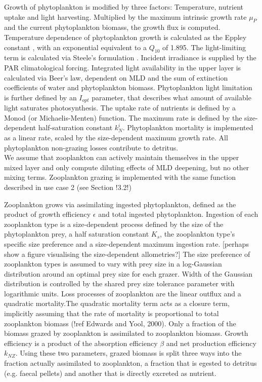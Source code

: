 \documentclass[template.tex]{subfiles}
\begin{document}
Growth of phytoplankton is modified by three factors: Temperature, nutrient uptake and light harvesting. Multiplied by the maximum intrinsic growth rate $\mu_P$ and the current phytoplankton biomass, the growth flux is computed. Temperature dependence of phytoplankton growth is calculated as the Eppley constant \citep{Eppley1972TemperatureSea}, with an exponential equivalent to a $Q_{10}$ of 1.895.
The light-limiting term is calculated via Steele's formulation \citep{Steele1962EnvironmentalSea}. Incident irradiance is supplied by the PAR climatological forcing. Integrated light availability in the upper layer is calculated via Beer's law, dependent on MLD and the sum of extinction coefficients of water and phytoplankton biomass. Phytoplankton light limitation is further defined by an $I_{opt}$ parameter, that describes what amount of available light saturates photosynthesis.
The uptake rate of nutrients is defined by a Monod (or Michaelis-Menten) function. The maximum rate is defined by the size-dependent half-saturation constant $k^i_N$. 
Phytoplankton mortality is implemented as a linear rate, scaled by the size-dependent maximum growth rate. 
All phytoplankton non-grazing losses contribute to detritus.\\

We assume that zooplankton can actively maintain themselves in the upper mixed layer and only compute diluting effects of MLD deepening, but no other mixing terms.
Zooplankton grazing is implemented with the same function described in use case 2 (see Section !3.2!) 

Zooplankton grows via assimilating ingested phytoplankton, defined as the product of growth efficiency $\epsilon$ and total ingested phytoplankton. Ingestion of each zooplankton type is a size-dependent process defined by the size of the phytoplankton prey, a half saturation constant $K_s$, the zooplankton type's specific size preference and a size-dependent maximum ingestion rate. [perhaps show a figure visualising the size-dependent allometries?]
The size preference of zooplankton types is assumed to vary with prey size in a log-Gaussian distribution around an optimal prey size for each grazer.
Width of the Gaussian distribution is controlled by the shared prey size tolerance parameter with logarithmic units.
Loss processes of zooplankton are the linear outflux and a quadratic mortality.The quadratic mortality term acts as a closure term, implicitly assuming that the rate of mortality is proportional to total zooplankton biomass (!ref Edwards and Yool, 2000). 
Only a fraction of the biomass grazed by zooplankton is assimilated to zooplankton biomass. Growth efficiency is a product of the absorption efficiency $\beta$ and net production efficiency $k_{NZ}$. Using these two parameters, grazed biomass is split three ways into the fraction actually assimilated to zooplankton, a fraction that is egested to detritus (e.g. faecal pellets) and another that is directly excreted as nutrient. 
\end{document}
